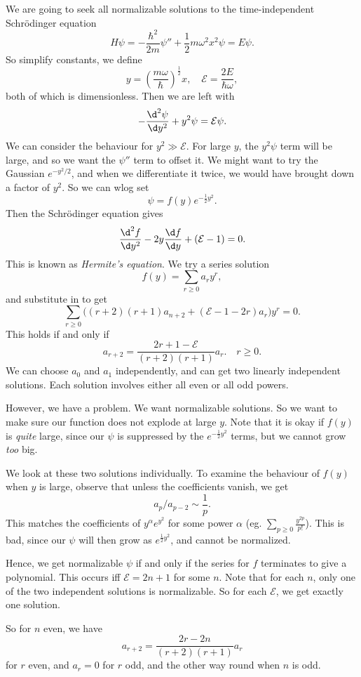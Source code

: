\documentclass[a4paper]{article}
\begin{document}
We are going to seek all normalizable solutions to the time-independent Schr\"odinger equation
\[
  H\psi = -\frac{\hbar^2}{2m}\psi'' + \frac{1}{2}m\omega^2 x^2 \psi = E\psi.
\]
So simplify constants, we define
\[
  y = \left(\frac{m\omega}{\hbar}\right)^{\frac{1}{2}}x,\quad \mathcal{E} = \frac{2E}{\hbar \omega},
\]
both of which is dimensionless. Then we are left with
\[
  -\frac{\d^2 \psi}{\d y^2} + y^2\psi = \mathcal{E} \psi.
\]
We can consider the behaviour for $y^2 \gg \mathcal{E}$. For large $y$, the $y^2 \psi$ term will be large, and so we want the $\psi''$ term to offset it. We might want to try the Gaussian $e^{-y^2/2}$, and when we differentiate it twice, we would have brought down a factor of $y^2$. So we can wlog set
\[
  \psi = f(y) e^{-\frac{1}{2}y^2}.
\]
Then the Schr\"odinger equation gives
\[
  \frac{\d^2 f}{\d y^2} - 2y\frac{\d f}{\d y} + (\mathcal{E} - 1) = 0.
\]
This is known as \emph{Hermite's equation}. We try a series solution
\[
  f(y) = \sum_{r \geq 0} a_r y^r,
\]
and substitute in to get
\[
  \sum_{r \geq 0} \big( (r + 2)(r + 1)a_{n + 2} + (\mathcal{E} - 1 - 2r)a_r\big) y^r = 0.
\]
This holds if and only if
\[
  a_{r + 2} = \frac{2 r + 1 - \mathcal{E}}{(r + 2)(r + 1)} a_r.\quad r \geq 0.
\]
We can choose $a_0$ and $a_1$ independently, and can get two linearly independent solutions. Each solution involves either all even or all odd powers.

However, we have a problem. We want normalizable solutions. So we want to make sure our function does not explode at large $y$. Note that it is okay if $f(y)$ is \emph{quite} large, since our $\psi$ is suppressed by the $e^{-\frac{1}{2}y^2}$ terms, but we cannot grow \emph{too} big.

We look at these two solutions individually. To examine the behaviour of $f(y)$ when $y$ is large, observe that unless the coefficients vanish, we get
\[
  a_{p}/a_{p - 2} \sim \frac{1}{p}.
\]
This matches the coefficients of $y^\alpha e^{y^2}$ for some power $\alpha$ (eg. $\sum_{p \geq 0} \frac{y^{2p}}{p!}$). This is bad, since our $\psi$ will then grow as $e^{\frac{1}{2}y^2}$, and cannot be normalized.

Hence, we get normalizable $\psi$ if and only if the series for $f$ terminates to give a polynomial. This occurs iff $\mathcal{E} = 2n + 1$ for some $n$. Note that for each $n$, only one of the two independent solutions is normalizable. So for each $\mathcal{E}$, we get exactly one solution.

So for $n$ even, we have
\[
  a_{r + 2} = \frac{2r - 2n}{(r + 2)(r + 1)} a_r
\]
for $r$ even, and $a_r = 0$ for $r$ odd, and the other way round when $n$ is odd.
\end{document}
